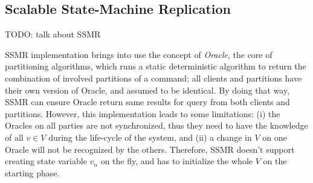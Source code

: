 \subsection{Scalable State-Machine Replication}
TODO: talk about SSMR

SSMR implementation brings into use the concept of \emph{Oracle}, the core of partitioning algorithms, which runs a static deterministic algorithm to return the combination of involved partitions of a command; all clients and partitions have their own version of Oracle, and assumed to be identical. By doing that way, SSMR can ensure Oracle return same results for query from both clients and partitions. However, this implementation leads to some limitations: (i) the Oracles on all parties are not synchronized, thus they need to have the knowledge of all $v \in V$ during the life-cycle of the system, and (ii) a change in $V$ on one Oracle will not be recognized by the others. Therefore, SSMR doesn't support creating state variable $v_n$ on the fly, and has to initialize the whole $V$ on the starting phase.
